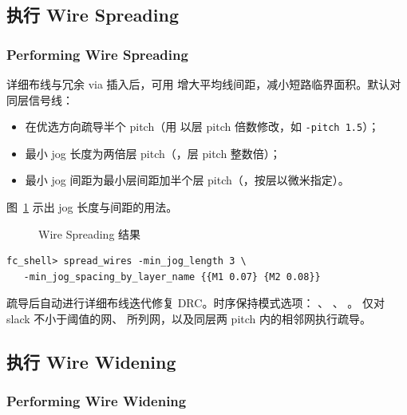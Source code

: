 \subsection{执行 Wire Spreading}
\subsubsection*{Performing Wire Spreading}

详细布线与冗余 via 插入后，可用  增大平均线间距，减小短路临界面积。默认对同层信号线：
\begin{itemize}
  \item 在优选方向疏导半个 pitch（用  以层 pitch 倍数修改，如 \texttt{-pitch 1.5}）；
  \item 最小 jog 长度为两倍层 pitch（，层 pitch 整数倍）；
  \item 最小 jog 间距为最小层间距加半个层 pitch（，按层以微米指定）。
\end{itemize}

图~\ref{fig:wire-spreading} 示出 jog 长度与间距的用法。

\begin{figure}[htbp]
\centering
{}
\caption{Wire Spreading 结果}
\label{fig:wire-spreading}
\end{figure}

\begin{lstlisting}
fc_shell> spread_wires -min_jog_length 3 \
   -min_jog_spacing_by_layer_name {{M1 0.07} {M2 0.08}}
\end{lstlisting}

疏导后自动进行详细布线迭代修复 DRC。时序保持模式选项：
、
、
。
仅对 slack 不小于阈值的网、 所列网，以及同层两 pitch 内的相邻网执行疏导。

\subsection{执行 Wire Widening}
\subsubsection*{Performing Wire Widening}

